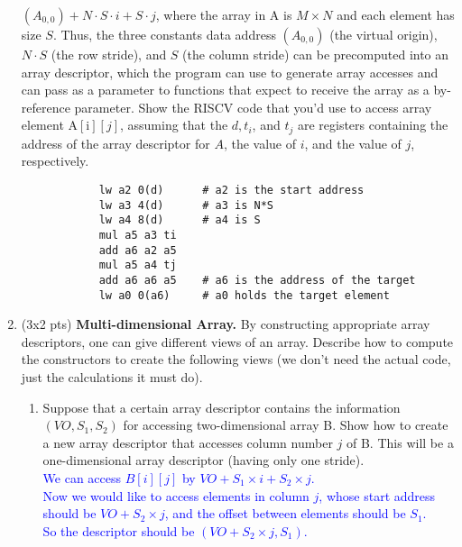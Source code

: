\documentclass[10pt]{article}
\begin{document}
\begin{enumerate}
          $\left(A_{0,0}\right)+N \cdot S \cdot i+S \cdot j$, where the array in A is $M \times N$ and each element has size
          $S$. Thus, the three constants data address $\left(A_{0,0}\right)$ (the virtual origin), $N \cdot S$ (the row
          stride), and $S$ (the column stride) can be precomputed into an array descriptor, which the program can use to
          generate array accesses and can pass as a parameter to functions that expect to receive the array as a
          by-reference parameter. Show the RISCV code that you'd use to access array element $\mathrm{A}[\mathrm{i}][j]$,
          assuming that the $d, t_{i}$, and $t_{j}$ are registers containing the address of the array descriptor for $A$,
          the value of $i$, and the value of $j$, respectively.

          \begin{verbatim}
            lw a2 0(d)      # a2 is the start address
            lw a3 4(d)      # a3 is N*S
            lw a4 8(d)      # a4 is S
            mul a5 a3 ti
            add a6 a2 a5
            mul a5 a4 tj
            add a6 a6 a5    # a6 is the address of the target
            lw a0 0(a6)     # a0 holds the target element
            \end{verbatim}
    \item (3x2 pts) \textbf{Multi-dimensional Array.} By constructing appropriate array descriptors, one can give
          different views of an array. Describe how to compute the constructors to create the following views (we don't need
          the actual code, just the calculations it must do).
          \begin{enumerate}
              \item Suppose that a certain array descriptor contains the information $\left(V O, S_{1}, S_{2}\right)$ for
                    accessing two-dimensional array B. Show how to create a new array descriptor that accesses column number $j$ of B.
                    This will be a one-dimensional array descriptor (having only one stride).
                    \textcolor{blue}{\\
                        We can access $B[i][j]$ by $VO+S_1\times i+S_2\times j$.\\
                        Now we would like to access elements in column $j$, whose start address should be $VO+S_2\times j$, and the offset between elements should be $S_1$.\\
                        So the descriptor should be $(VO+S_2\times j,S_1)$.
                    }

\end{enumerate}
\end{enumerate}
\end{document}
